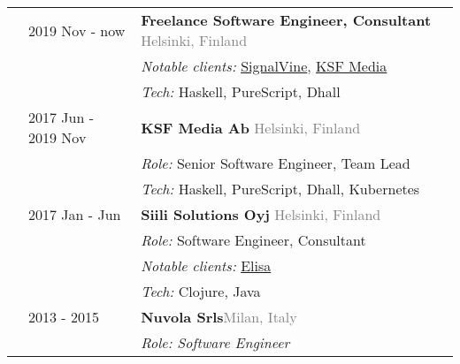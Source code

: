 \documentclass[a4paper,10pt]{article}
\newcommand{\locationRight}[1]{\hfill {\footnotesize \textcolor{gray}{#1}}}
\begin{document}
\noindent
\large
\begin{tabularx}{\textwidth}{ C{0.5cm} L{4.0cm} *{1}{X}}
  & 2019 Nov - now & \textbf{Freelance Software Engineer, Consultant} \locationRight{Helsinki, Finland} \vspace{1 mm}\\
	&			  & \hspace{5mm} {\normalsize \emph{Notable clients:} \href{https://signalvine.com}{SignalVine}, \href{https://ksfmedia.fi}{KSF Media} \vspace{0 mm}} \\
	&			  & \hspace{5mm} {\normalsize \emph{Tech:} Haskell, PureScript, Dhall \vspace{4 mm}} \\
  & 2017 Jun - 2019 Nov & \textbf{KSF Media Ab} \locationRight{Helsinki, Finland} \vspace{1 mm}\\
	&			  & \hspace{5mm} {\normalsize \emph{Role:} Senior Software Engineer, Team Lead \vspace{0 mm}} \\
	&			  & \hspace{5mm} {\normalsize \emph{Tech:} Haskell, PureScript, Dhall, Kubernetes \vspace{4 mm}} \\
  & 2017 Jan - Jun & \textbf{Siili Solutions Oyj} \locationRight{Helsinki, Finland} \vspace{1 mm}\\
	&			  & \hspace{5mm} {\normalsize \emph{Role:} Software Engineer, Consultant \vspace{0 mm}} \\
	&			  & \hspace{5mm} {\normalsize \emph{Notable clients:} \href{https://elisa.fi}{Elisa} \vspace{0 mm}} \\
	&			  & \hspace{5mm} {\normalsize \emph{Tech:} Clojure, Java \vspace{4mm}} \\
	& 2013 - 2015 & \textbf{Nuvola Srls}\locationRight{Milan, Italy} \vspace{1 mm}\\
	&			  & \hspace{5mm} \emph{\normalsize Role: Software Engineer \vspace{0 mm}}\\

\end{tabularx}
\end{document}
